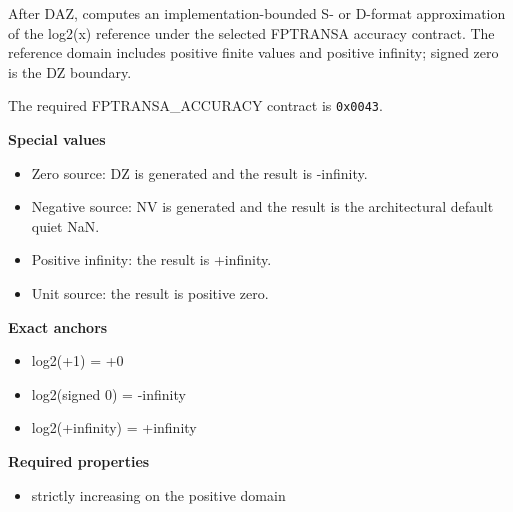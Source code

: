 After DAZ, computes an implementation-bounded S- or D-format approximation of the log2(x) reference under the selected FPTRANSA accuracy contract. The reference domain includes positive finite values and positive infinity; signed zero is the DZ boundary.

The required FPTRANSA\_ACCURACY contract is \texttt{0x0043}.

\textbf{Special values}\par
\begin{itemize}
\item Zero source: DZ is generated and the result is -infinity.
\item Negative source: NV is generated and the result is the architectural default quiet NaN.
\item Positive infinity: the result is +infinity.
\item Unit source: the result is positive zero.
\end{itemize}

\textbf{Exact anchors}\par
\begin{itemize}
\item log2(+1) = +0
\item log2(signed 0) = -infinity
\item log2(+infinity) = +infinity
\end{itemize}

\textbf{Required properties}\par
\begin{itemize}
\item strictly increasing on the positive domain
\end{itemize}
